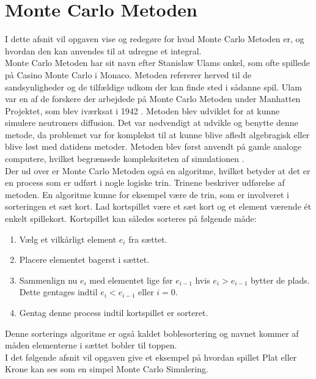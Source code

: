 \documentclass[../../SRP.tex]{subfiles}
\begin{document}
\chapter{Monte Carlo Metoden}

I dette afsnit vil opgaven vise og redegøre for hvad Monte Carlo Metoden er, og hvordan den kan anvendes til at udregne et integral. \\

Monte Carlo Metoden har sit navn efter Stanislaw Ulams onkel, som ofte spillede på Casino Monte Carlo i Monaco. Metoden refererer herved til de sandsynligheder og de tilfældige udkom der kan finde sted i sådanne spil. Ulam var en af de forskere der arbejdede på Monte Carlo Metoden under Manhatten Projektet, som blev iværksat i 1942 \cite{MSD}. Metoden blev udviklet for at kunne simulere neutroners diffusion. Det var nødvendigt at udvikle og benytte denne metode, da problemet var for komplekst til at kunne blive afledt algebragisk eller blive løst med datidens metoder. Metoden blev først anvendt på gamle analoge computere, hvilket begrænsede kompleksiteten af simulationen \cite{AHF}. \\

Der ud over er Monte Carlo Metoden også en algoritme, hvilket betyder at det er en process som er udført i nogle logiske trin. Trinene beskriver udførelse af metoden. En algoritme kunne for eksempel være de trin, som er involveret i sorteringen et sæt kort. Lad kortspillet være et sæt kort og et element værende ét enkelt spillekort. Kortspillet kan således sorteres på følgende måde:
\begin{enumerate}
  \item Vælg et vilkårligt element $e_i$ fra sættet.
  
  \item Placere elementet bagerst i sættet.

  \item Sammenlign nu $e_i$ med elementet lige før $e_{i-1}$ hvis $e_i > e_{i-1}$ bytter de plads. Dette gentages indtil $e_i < e_{i-1}$ eller $i = 0$.

  \item Gentag denne process indtil kortspillet er sorteret.
\end{enumerate}
Denne sorterings algoritme er også kaldet boblesortering og navnet kommer af måden elementerne i sættet bobler til toppen. \cite{BS} \\

I det følgende afsnit vil opgaven give et eksempel på hvordan spillet Plat eller Krone kan ses som en simpel Monte Carlo Simulering. \\
\end{document}
